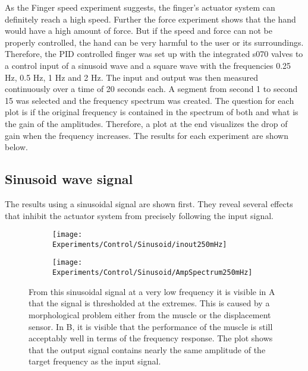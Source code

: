 \documentclass[main]{subfiles}
\begin{document}
As the Finger speed experiment suggests, the finger's actuator system can definitely reach a high speed. Further the force experiment shows that the hand would have a high amount of force. But if the speed and force can not be properly controlled, the hand can be very harmful to the user or its surroundings. Therefore, the PID controlled finger was set up with the integrated s070 valves to a control input of a sinusoid wave and a square wave with the frequencies 0.25 Hz, 0.5 Hz, 1 Hz and 2 Hz. The input and output was then measured continuously over a time of 20 seconds each. A segment from second 1 to second 15 was selected and the frequency spectrum was created. The question for each plot is if the original frequency is contained in the spectrum of both and what is the gain of the amplitudes. Therefore, a plot at the end visualizes the drop of gain when the frequency increases. The results for each experiment are shown below.

\subsection{Sinusoid wave signal}

The results using a sinusoidal signal are shown first. They reveal several effects that inhibit the actuator system from precisely following the input signal. 

\begin{figure}[H]
\begin{adjustwidth}{-8em}{-3em}
\begin{subfigure}[t]{0.665\textwidth}
\texttt{[image: Experiments/Control/Sinusoid/inout250mHz]}
\end{subfigure}\hspace{0.05\textwidth}
\begin{subfigure}[t]{0.6\textwidth}
\texttt{[image: Experiments/Control/Sinusoid/AmpSpectrum250mHz]}
\end{subfigure}
\end{adjustwidth}
\caption[Sinusoid control signal at 250mHz]{From this sinusoidal signal at a very low frequency it is visible in A that the signal is thresholded at the extremes. This is caused by a morphological problem either from the muscle or the displacement sensor. In B, it is visible that the performance of the muscle is still acceptably well in terms of the frequency response. The plot shows that the output signal contains nearly the same amplitude of the target frequency as the input signal.}
\label{sin-250mHz}
\end{figure}
\end{document}
